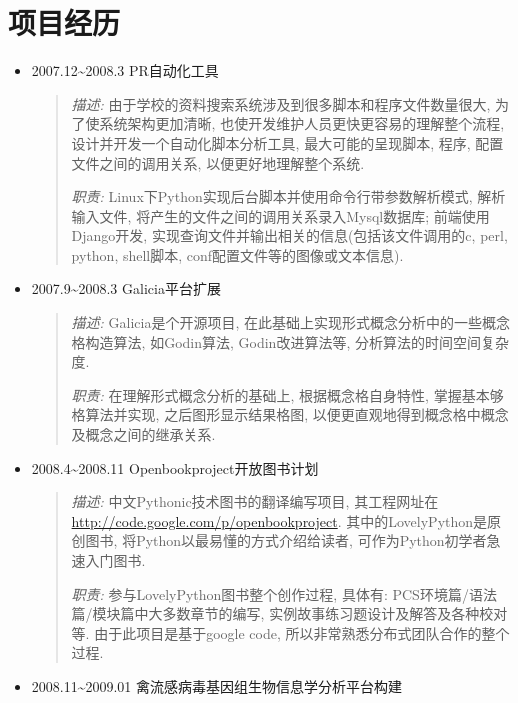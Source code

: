 \documentclass[a4paper,10pt,english]{manual}
\begin{document}
\section{项目经历}
\begin{itemize}
\item {} 
2007.12\textasciitilde{}2008.3 PR自动化工具
\begin{quote}

\emph{描述:} 由于学校的资料搜索系统涉及到很多脚本和程序文件数量很大, 为了使系统架构更加清晰, 也使开发维护人员更快更容易的理解整个流程, 设计并开发一个自动化脚本分析工具, 最大可能的呈现脚本, 程序, 配置文件之间的调用关系, 以便更好地理解整个系统.

\emph{职责:} Linux下Python实现后台脚本并使用命令行带参数解析模式, 解析输入文件, 将产生的文件之间的调用关系录入Mysql数据库; 前端使用Django开发, 实现查询文件并输出相关的信息(包括该文件调用的c, perl, python, shell脚本, conf配置文件等的图像或文本信息).

\end{quote}

\item {} 
2007.9\textasciitilde{}2008.3 Galicia平台扩展
\begin{quote}

\emph{描述:} Galicia是个开源项目, 在此基础上实现形式概念分析中的一些概念格构造算法, 如Godin算法, Godin改进算法等, 分析算法的时间空间复杂度.

\emph{职责:} 在理解形式概念分析的基础上, 根据概念格自身特性, 掌握基本够格算法并实现, 之后图形显示结果格图, 以便更直观地得到概念格中概念及概念之间的继承关系.

\end{quote}

\item {} 
2008.4\textasciitilde{}2008.11 Openbookproject开放图书计划
\begin{quote}

\emph{描述:} 中文Pythonic技术图书的翻译编写项目, 其工程网址在 \href{http://code.google.com/p/openbookproject/}{http://code.google.com/p/openbookproject}. 其中的LovelyPython是原创图书, 将Python以最易懂的方式介绍给读者, 可作为Python初学者急速入门图书.

\emph{职责:} 参与LovelyPython图书整个创作过程, 具体有: PCS环境篇/语法篇/模块篇中大多数章节的编写, 实例故事练习题设计及解答及各种校对等. 由于此项目是基于google code, 所以非常熟悉分布式团队合作的整个过程.

\end{quote}

\item {} 
2008.11\textasciitilde{}2009.01 禽流感病毒基因组生物信息学分析平台构建
\begin{quote}


\end{quote}
\end{itemize}
\end{document}
